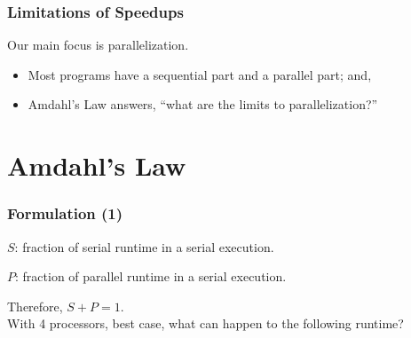 \documentclass[aspectratio=43]{beamer}
\begin{document}
\begin{frame}
  \frametitle{Limitations of Speedups}
\hspace*{.2\textwidth}\begin{minipage}{.75\textwidth}
    Our main focus is parallelization.\\[1em]
  \begin{itemize}
    \vfill
    \item Most programs have a sequential part and a parallel part; and,\\[1em]
    \item Amdahl's Law answers, ``what are the limits to parallelization?''
  \end{itemize}
\end{minipage}

\end{frame}


\section{Amdahl's Law}
\begin{frame}
  \frametitle{Formulation (1)}

  \hspace*{2em}\begin{minipage}{.8\textwidth}
  $S$: fraction of serial runtime in a serial execution.

  $P$: fraction of parallel runtime in a serial execution.

  Therefore, $S + P = 1$.\\[2em]

  With 4 processors, best case, what can happen to the following runtime?
  \end{minipage}

  \hspace*{5em}
\end{frame}
\end{document}
